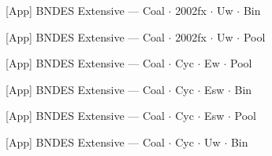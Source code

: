 \documentclass[aspectratio=169,10pt]{beamer}
\newcommand{\tabledir}{../tables/firm}
\begin{document}
\begin{frame}[t,shrink=5]{[App] BNDES Extensive --- Coal $\cdot$ 2002fx $\cdot$ Uw $\cdot$ Bin}
\begin{center}\footnotesize

\end{center}
\end{frame}

\begin{frame}[t,shrink=5]{[App] BNDES Extensive --- Coal $\cdot$ 2002fx $\cdot$ Uw $\cdot$ Pool}
\begin{center}\footnotesize

\end{center}
\end{frame}

\begin{frame}[t,shrink=5]{[App] BNDES Extensive --- Coal $\cdot$ Cyc $\cdot$ Ew $\cdot$ Pool}
\begin{center}\footnotesize

\end{center}
\end{frame}

\begin{frame}[t,shrink=5]{[App] BNDES Extensive --- Coal $\cdot$ Cyc $\cdot$ Esw $\cdot$ Bin}
\begin{center}\footnotesize

\end{center}
\end{frame}

\begin{frame}[t,shrink=5]{[App] BNDES Extensive --- Coal $\cdot$ Cyc $\cdot$ Esw $\cdot$ Pool}
\begin{center}\footnotesize

\end{center}
\end{frame}

\begin{frame}[t,shrink=5]{[App] BNDES Extensive --- Coal $\cdot$ Cyc $\cdot$ Uw $\cdot$ Bin}
\begin{center}\footnotesize

\end{center}
\end{frame}
\end{document}
